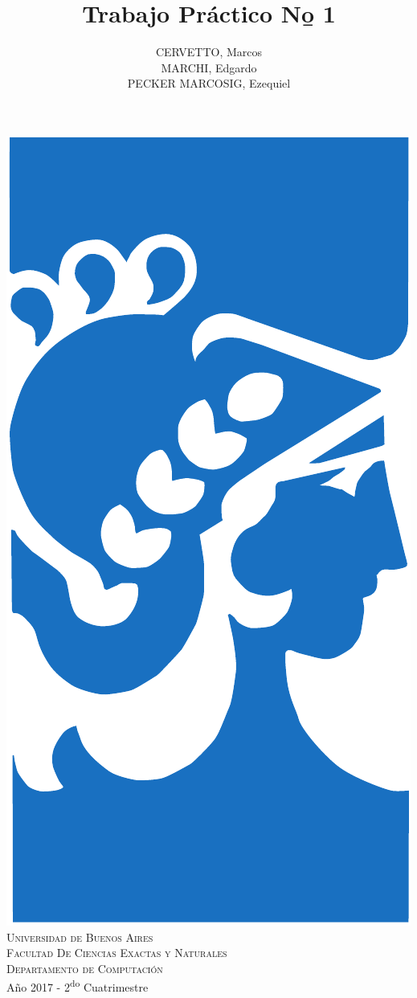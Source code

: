 \documentclass[10pt]{article}
\title{Trabajo Práctico N\b o 1}
\author{CERVETTO, Marcos\\MARCHI, Edgardo\\PECKER MARCOSIG, Ezequiel}
\begin{document}
%
%
\pagestyle{fancy}
\chead{}
\lfoot{}
\cfoot{}
\rfoot{\thepage}

%
%
\begin{titlepage}

\thispagestyle{empty}

\begin{center}
\includegraphics[scale=0.3]{img/fiuba}\\
\large{\textsc{Universidad de Buenos Aires}}\\
\large{\textsc{Facultad De Ciencias Exactas y Naturales}}\\
\large{\textsc{Departamento de Computación}}\\
\small{Año 2017 - 2\textsuperscript{do} Cuatrimestre}
\end{center}


\end{titlepage}
\end{document}

